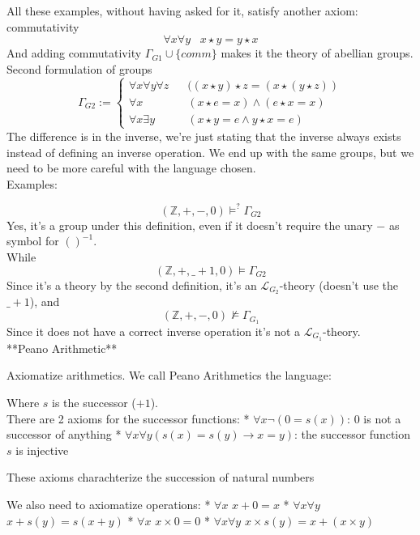 All these examples, without having asked for it, satisfy another axiom: commutativity
$$ \forall x \forall y \;\;\; x \star y = y \star x $$
And adding commutativity $\Gamma_{G1} \cup \{comm\}$ makes it the theory of abellian groups.\\

Second formulation of groups
$$
\Gamma_{G2} := \begin{cases} \forall x \forall y \forall z \;\;\; & ((x \star y)\star z = (x \star (y \star z)) \\
	\forall x & (x \star e = x) \wedge (e \star x = x) \\
	\forall x \exists y & (x \star y = e \wedge y \star x = e)
\end{cases}
$$
The difference is in the inverse, we're just stating that the inverse always exists instead of defining an inverse operation. We end up with the same groups, but we need to be more careful with the language chosen.\\

Examples: 
$$ 
$$

$$ (\mathbb{Z}, +, -, 0) \models^? \Gamma_{G2} $$
Yes, it's a group under this definition, even if it doesn't require the unary $-$ as symbol for $()^{-1}$.\\
While
$$ (\mathbb{Z}, +, \_+1, 0) \models \Gamma_{G2} $$
Since it's a theory by the second definition, it's an $\mathcal{L}_{G_2}$-theory (doesn't use the $\_+1$), and
$$ (\mathbb{Z}, +, -, 0) \not \models \Gamma_{G_1} $$
Since it does not have a correct inverse operation it's not a $\mathcal{L}_{G_1}$-theory.\\


**Peano Arithmetic**

Axiomatize arithmetics. We call Peano Arithmetics the language: 
$$ 
$$

Where $s$ is the successor ($+1$).\\

There are 2 axioms for the successor functions: 
* $\forall x \neg (0 = s(x))$: 0 is not a successor of anything
* $\forall x \forall y (s(x) = s(y) \rightarrow x = y)$: the successor function $s$ is injective

These axioms charachterize the succession of natural numbers

We also need to axiomatize operations:
* $\forall x$ $x + 0 = x$
* $\forall x \forall y$ $x + s(y) = s(x+y)$
* $\forall x$ $x \times 0 = 0$
* $\forall x \forall y$ $x \times s(y) = x + (x \times y)$

